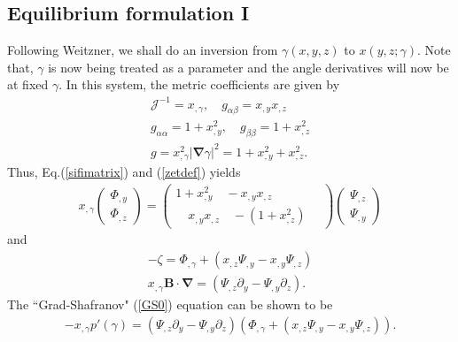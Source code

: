 \documentclass[aip,pop,reprint]{revtex4-1}
\newcommand*{\B}{\bm{B}}
\newcommand*{\Jac}{\mathscr{J}}
\newcommand*{\dl}{\bm{\nabla}}
\begin{document}
\subsection{Equilibrium formulation I}
 Following Weitzner\cite{weitzner2014ideal,weitzner2016expansions}, we shall do an inversion from $\gamma(x,y,z)$ to $x(y,z;\gamma)$. Note that, $\gamma$ is now being treated as a parameter and the angle derivatives will now be at fixed $\gamma$. In this system, the metric coefficients are given by
\begin{subequations}
\begin{align}
\Jac^{-1}=x_{,\gamma}, \quad g_{\alpha\beta}=x_{,y}x_{,z}\\
g_{\alpha\alpha}=1+x_{,y}^2 ,\quad g_{\beta\beta}=1+x_{,z}^2\\
g= x_{,\gamma}^2|\dl \gamma|^2 = 1+x_{,y}^2+x_{,z}^2.
\end{align}
\end{subequations}
Thus, Eq.(\ref{sifimatrix}) and (\ref{zetdef}) yields
\begin{align}
x_{,\gamma}\begin{pmatrix}
\Phi_{,y}\\ \Phi_{,z}
\end{pmatrix}=
\begin{pmatrix}
1+x_{,y}^2 \quad -x_{,y}x_{,z}\\ 
\quad x_{,y}x_{,z} \quad -(1+x_{,z}^2)\quad
\end{pmatrix}
\begin{pmatrix}
\Psi_{,z}\\ \Psi_{,y}
\end{pmatrix}
\label{sifixy}
\end{align}
and
\begin{subequations}
\begin{align}
-\zeta= \Phi_{,\gamma}+(x_{,z}\Psi_{,y}-x_{,y}\Psi_{,z}) \label{zetaI}\\
 x_{,\gamma}\B\cdot \dl =(\Psi_{,z}\partial_y - \Psi_{,y}\partial_z).
\label{BDI}
\end{align}
\end{subequations}
The ``Grad-Shafranov" (\ref{GS0}) equation can be shown to be
\begin{align}
-x_{,\gamma}p'(\gamma)=\left(\Psi_{,z}\partial_y - \Psi_{,y}\partial_z\right)\left( \Phi_{,\gamma}+(x_{,z}\Psi_{,y}-x_{,y}\Psi_{,z})\right). \label{GSI}
\end{align}
\end{document}
